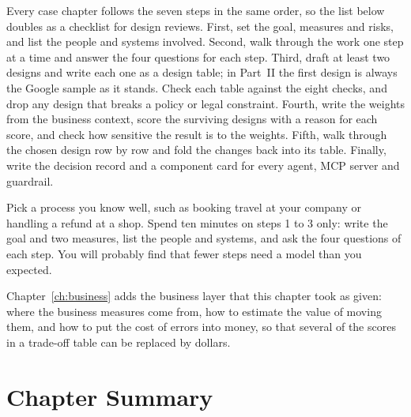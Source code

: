 Every case chapter follows the seven steps in the same order, so the list below doubles as a checklist for design reviews. First, set the goal, measures and risks, and list the people and systems involved. Second, walk through the work one step at a time and answer the four questions for each step. Third, draft at least two designs and write each one as a design table; in Part~II the first design is always the Google sample as it stands. Check each table against the eight checks, and drop any design that breaks a policy or legal constraint. Fourth, write the weights from the business context, score the surviving designs with a reason for each score, and check how sensitive the result is to the weights. Fifth, walk through the chosen design row by row and fold the changes back into its table. Finally, write the decision record and a component card for every agent, MCP server and guardrail.

\begin{tryit}
Pick a process you know well, such as booking travel at your company or handling a refund at a shop. Spend ten minutes on steps 1 to 3 only: write the goal and two measures, list the people and systems, and ask the four questions of each step. You will probably find that fewer steps need a model than you expected.
\end{tryit}

Chapter~\ref{ch:business} adds the business layer that this chapter took as given: where the business measures come from, how to estimate the value of moving them, and how to put the cost of errors into money, so that several of the scores in a trade-off table can be replaced by dollars.

\section*{Chapter Summary}

